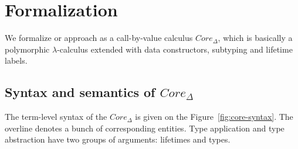 \documentclass[11pt]{article}
\begin{document}
%
%
%
%

    \clearpage

    \section{Formalization}

    We formalize or approach as a call-by-value calculus $Core_{\Delta}$, which is basically a polymorphic $\lambda$-calculus extended with data constructors, subtyping and lifetime labels.

    \subsection{Syntax and semantics of $Core_\Delta$}

    The term-level syntax of the $Core_\Delta$ is given on the Figure~\ref{fig:core-syntax}.
    The overline denotes a bunch of corresponding entities.
    Type application and type abstraction have two groups of arguments: lifetimes and types.
\end{document}
